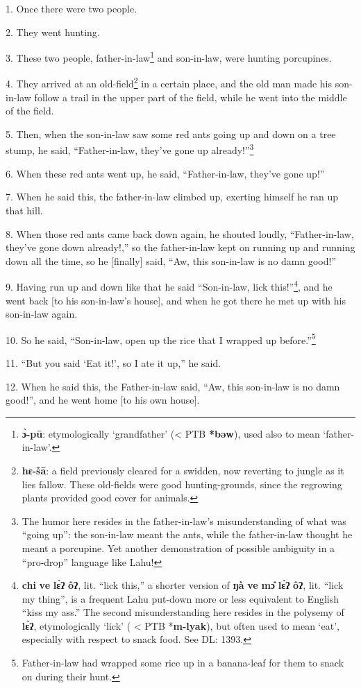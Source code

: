 \setcounter{footnote}{0}

1. Once there were two people.

2. They went hunting.

3. These two people, father-in-law\footnote{\textbf{ɔ̀-pū}: etymologically `grandfather' (< PTB \textbf{*bəw}), used also to mean `father-in-law'.} and son-in-law, were hunting porcupines.

4. They arrived at an old-field\footnote{\textbf{hɛ-šā}: a field previously cleared for a swidden, now reverting to jungle as it lies fallow. These old-fields were good hunting-grounds, since the regrowing plants provided good cover for animals.} in a certain place, and the old man made his
son-in-law follow a trail in the upper part of the field, while he went into the
middle of the field.

5. Then, when the son-in-law saw some red ants going up and down on a tree stump,
he said, ``Father-in-law, they've gone up already!''\footnote{The humor here resides in the father-in-law's misunderstanding of what was ``going up'': the son-in-law meant the ants, while the father-in-law thought he meant a porcupine. Yet another demonstration of possible ambiguity in a ``pro-drop'' language like Lahu!}

6. When these red ants went up, he said, ``Father-in-law, they've gone up!''

7. When he said this, the father-in-law climbed up, exerting himself he ran up
that hill.

8. When those red ants came back down again, he shouted loudly, ``Father-in-law,
they've gone down already!,'' so the father-in-law kept on running up and running
down all the time, so he [finally] said, ``Aw, this son-in-law is no damn good!''

9. Having run up and down like that he said ``Son-in-law, lick this!''\footnote{\textbf{chi} \textbf{ve} \textbf{lɛ̀ʔ} \textbf{ôʔ}, lit. ``lick this,'' a shorter version of \textbf{ŋà} \textbf{ve} \textbf{mɔ̂} \textbf{lɛ̀ʔ} \textbf{ôʔ}, lit. ``lick my thing'', is a frequent Lahu put-down more or less equivalent to English ``kiss my ass.'' The second misunderstanding here resides in the polysemy of \textbf{lɛ̀ʔ}, etymologically `lick' ( < PTB *\textbf{m-lyak}), but often used to mean `eat', especially with respect to snack food. See DL: 1393.}, and
he went back [to his son-in-law's house], and when he got there he met up with
his son-in-law again.

10. So he said, ``Son-in-law, open up the rice that I wrapped up before.''\footnote{Father-in-law had wrapped some rice up in a banana-leaf for them to snack on during their hunt.}

11. ``But you said `Eat it!', so I ate it up,'' he said.

12. When he said this, the Father-in-law said, ``Aw, this son-in-law is no damn
good!'', and he went home [to his own house].

